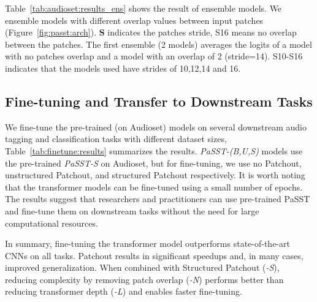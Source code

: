 \documentclass[a4paper]{article}
\begin{document}
Table~\ref{tab:audioset:results_ens} shows the result of ensemble models. We ensemble models with different  overlap values between input patches (Figure~\ref{fig:passt:arch}). \textbf{S} indicates the patches stride, S16 means no overlap between the patches. The first ensemble (2 models) averages the logits of a model with no patches overlap and a model with an overlap of 2 (stride=14). S10-S16 indicates that the models used have strides of 10,12,14 and 16. 


\subsection{Fine-tuning and Transfer to Downstream Tasks}
\label{sec:downstream:results}
We fine-tune the pre-trained (on Audioset) models on several downstream audio tagging and classification tasks with different dataset sizes, Table~\ref{tab:finetune:results} summarizes the results. \emph{PaSST-(B,U,S)} models use the pre-trained \emph{PaSST-S} on Audioset, but for fine-tuning, we use no Patchout, unstructured Patchout, and structured Patchout respectively. 
 It is worth noting that the transformer models can be fine-tuned using a small number of epochs. The results suggest that researchers and practitioners can use pre-trained PaSST and fine-tune them on downstream tasks without the need for large computational resources. 

In summary, fine-tuning the transformer model outperforms state-of-the-art CNNs on all tasks. Patchout results in significant speedups and, in many cases, improved generalization. When combined with Structured Patchout (\emph{-S}), reducing complexity by removing patch overlap (\emph{-N}) performs better than reducing transformer depth (\emph{-L}) and enables faster fine-tuning.
\end{document}
